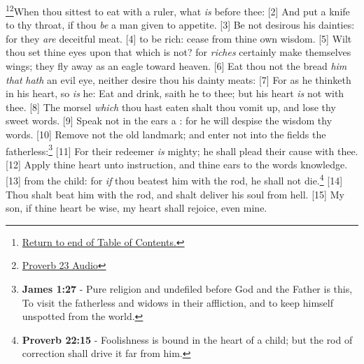 \footnote{\textcolor[cmyk]{0.99998,1,0,0}{\hyperlink{TOC}{Return to end of Table of Contents.}}}\footnote{\href{https://audiobible.com/bible/proverbs_23.htm}{\textcolor[cmyk]{0.99998,1,0,0}{Proverb 23 Audio}}}\textcolor[cmyk]{0.99998,1,0,0}{When thou sittest to eat with a ruler,   what \emph{is} before thee:}
[2] \textcolor[cmyk]{0.99998,1,0,0}{And put a knife to thy throat, if thou \emph{be} a man given to appetite.}
[3] \textcolor[cmyk]{0.99998,1,0,0}{Be not desirous  his dainties: for they \emph{are} deceitful meat.}
[4] \textcolor[cmyk]{0.99998,1,0,0}{    to be rich: cease from thine own wisdom.}
[5] \textcolor[cmyk]{0.99998,1,0,0}{Wilt thou set thine eyes upon that which is not? for \emph{riches} certainly make themselves wings; they fly away as an eagle toward heaven.}
[6] \textcolor[cmyk]{0.99998,1,0,0}{Eat thou not the bread  \emph{him} \emph{that} \emph{hath} an evil eye, neither desire thou his dainty meats:}
[7] \textcolor[cmyk]{0.99998,1,0,0}{For as he thinketh in his heart, so \emph{is} he: Eat and drink, saith he to thee; but his heart \emph{is} not with thee.}
[8] \textcolor[cmyk]{0.99998,1,0,0}{The morsel \emph{which} thou hast eaten shalt thou vomit up, and lose thy sweet words.}
[9] \textcolor[cmyk]{0.99998,1,0,0}{Speak not in the ears  a  : for he will despise the wisdom  thy words.}
[10] \textcolor[cmyk]{0.99998,1,0,0}{Remove not the old landmark; and enter not into the fields  the fatherless:}\footnote{\textbf{James 1:27} - Pure religion and undefiled before God and the Father is this, To visit the fatherless and widows in their affliction, and to keep himself unspotted from the world.}
[11] \textcolor[cmyk]{0.99998,1,0,0}{For their redeemer \emph{is} mighty; he shall plead their cause with thee.}
[12] \textcolor[cmyk]{0.99998,1,0,0}{Apply thine heart unto instruction, and thine ears to the words  knowledge.}
[13] \textcolor[cmyk]{0.99998,1,0,0}{  from the child: for \emph{if} thou beatest him with the rod, he shall not die.}\footnote{\textbf{Proverb 22:15} - Foolishness is bound in the heart of a child; but the rod of correction shall drive it far from him.}
[14] \textcolor[cmyk]{0.99998,1,0,0}{Thou shalt beat him with the rod, and shalt deliver his soul from hell.}
[15] \textcolor[cmyk]{0.99998,1,0,0}{My son, if thine heart be wise, my heart shall rejoice, even mine.}
